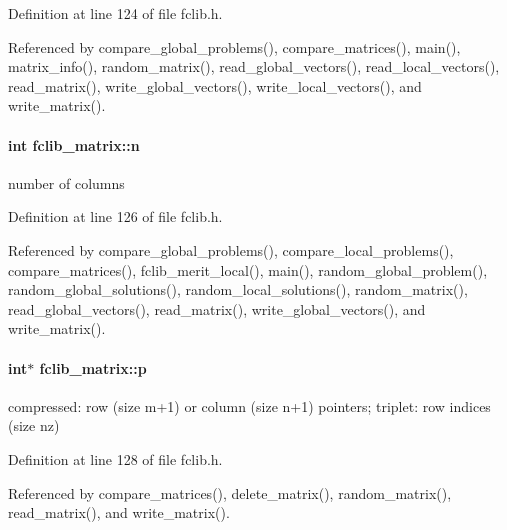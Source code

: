 Definition at line 124 of file fclib.\-h.



Referenced by compare\-\_\-global\-\_\-problems(), compare\-\_\-matrices(), main(), matrix\-\_\-info(), random\-\_\-matrix(), read\-\_\-global\-\_\-vectors(), read\-\_\-local\-\_\-vectors(), read\-\_\-matrix(), write\-\_\-global\-\_\-vectors(), write\-\_\-local\-\_\-vectors(), and write\-\_\-matrix().

\hypertarget{structfclib__matrix_ace0c395ca5da8a4bcc4958a29895c639}{
\paragraph[{n}]{\setlength{\rightskip}{0pt plus 5cm}int fclib\-\_\-matrix\-::n}}\label{structfclib__matrix_ace0c395ca5da8a4bcc4958a29895c639}


number of columns 



Definition at line 126 of file fclib.\-h.



Referenced by compare\-\_\-global\-\_\-problems(), compare\-\_\-local\-\_\-problems(), compare\-\_\-matrices(), fclib\-\_\-merit\-\_\-local(), main(), random\-\_\-global\-\_\-problem(), random\-\_\-global\-\_\-solutions(), random\-\_\-local\-\_\-solutions(), random\-\_\-matrix(), read\-\_\-global\-\_\-vectors(), read\-\_\-matrix(), write\-\_\-global\-\_\-vectors(), and write\-\_\-matrix().

\hypertarget{structfclib__matrix_ace167d937e3c1bb2558e264aefada841}{
\paragraph[{p}]{\setlength{\rightskip}{0pt plus 5cm}int$\ast$ fclib\-\_\-matrix\-::p}}\label{structfclib__matrix_ace167d937e3c1bb2558e264aefada841}


compressed\-: row (size m+1) or column (size n+1) pointers; triplet\-: row indices (size nz) 



Definition at line 128 of file fclib.\-h.



Referenced by compare\-\_\-matrices(), delete\-\_\-matrix(), random\-\_\-matrix(), read\-\_\-matrix(), and write\-\_\-matrix().


